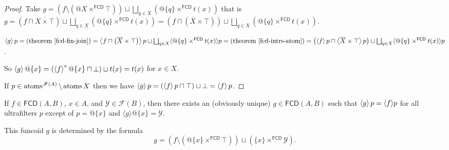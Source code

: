 \begin{proof}
  Take $g = (f \setminus (@X \times^{\mathsf{FCD}} \top)) \sqcup
  \bigsqcup_{q \in X} (@\{ q \} \times^{\mathsf{FCD}} t (x))$ that is $g
  = \left( f \sqcap \overline{X \times \top} \right) \sqcup \bigsqcup_{q \in
  X} (@\{ q \} \times^{\mathsf{FCD}} t (x)) = \left( f \sqcap \left(
  \overline{X} \times \top \right) \right) \sqcup \bigsqcup_{q \in X} (@\{ q \}
  \times^{\mathsf{FCD}} t (x))$.

  $\supfun{g} p = \text{(theorem~\ref{fcd-fin-join})} = \left\langle f
  \sqcap \left( \overline{X} \times \top \right) \right\rangle p \sqcup
  \bigsqcup_{q \in X} \langle @\{ q \} \times^{\mathsf{FCD}} t (x)
  \rangle p = \text{(theorem~\ref{fcd-intrs-atom})} = \left( \supfun{f} p \sqcap
  \left\langle \overline{X} \times \top \right\rangle p \right) \sqcup
  \bigsqcup_{q \in X} \langle @\{ q \} \times^{\mathsf{FCD}} t (x)
  \rangle p$.

  So $\left\langle g\right\rangle @\{ x \} = (\left\langle f\right\rangle^{\ast} @\{ x \} \sqcap
  \bot) \sqcup t (x) = t (x)$ for $x \in X$.

  If $p \in \operatorname{atoms}^{\mathscr{F} (A)} \setminus \operatorname{atoms} X$ then we
  have $\left\langle g\right\rangle p = (\left\langle f\right\rangle p \sqcap \top) \sqcup \bot =
  \left\langle f\right\rangle p$.
\end{proof}

\begin{cor}
  If $f \in \mathsf{FCD} (A, B)$, $x \in A$, and $\mathcal{Y} \in
  \mathscr{F} (B)$, then there exists an (obviously unique) $g \in
  \mathsf{FCD} (A, B)$ such that $\left\langle g\right\rangle p = \langle f
  \rangle p$ for all ultrafilters $p$ except of $p = @\{ x \}$ and $\langle g
  \rangle @\{ x \} = \mathcal{Y}$.

  This funcoid $g$ is determined by the formula
  \[ g = (f \setminus (@\{ x \} \times^{\mathsf{FCD}} \top)) \sqcup (\{
     x \} \times^{\mathsf{FCD}} \mathcal{Y}) . \]
\end{cor}

